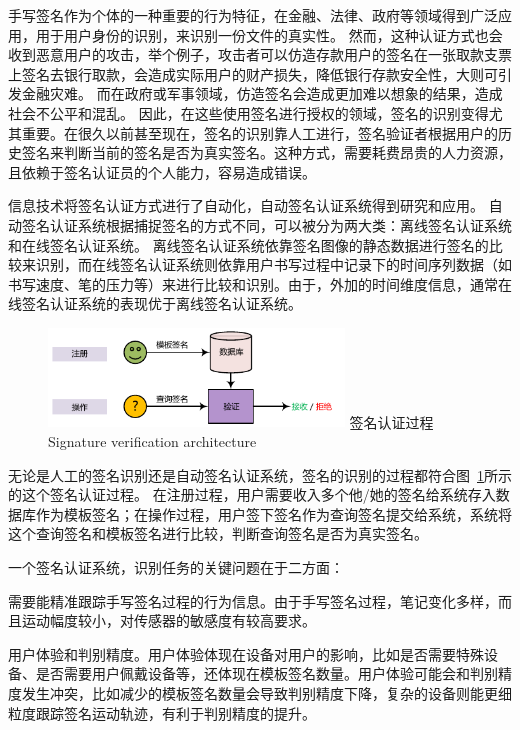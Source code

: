手写签名作为个体的一种重要的行为特征，在金融、法律、政府等领域得到广泛应用，用于用户身份的识别，来识别一份文件的真实性。 然而，这种认证方式也会收到恶意用户的攻击，举个例子，攻击者可以仿造存款用户的签名在一张取款支票上签名去银行取款，会造成实际用户的财产损失，降低银行存款安全性，大则可引发金融灾难。 而在政府或军事领域，仿造签名会造成更加难以想象的结果，造成社会不公平和混乱。 因此，在这些使用签名进行授权的领域，签名的识别变得尤其重要。在很久以前甚至现在，签名的识别靠人工进行，签名验证者根据用户的历史签名来判断当前的签名是否为真实签名。这种方式，需要耗费昂贵的人力资源，且依赖于签名认证员的个人能力，容易造成错误。

信息技术将签名认证方式进行了自动化，自动签名认证系统得到研究和应用。 自动签名认证系统根据捕捉签名的方式不同，可以被分为两大类：离线签名认证系统和在线签名认证系统。 离线签名认证系统依靠签名图像的静态数据进行签名的比较来识别，而在线签名认证系统则依靠用户书写过程中记录下的时间序列数据（如书写速度、笔的压力等）来进行比较和识别。由于，外加的时间维度信息，通常在线签名认证系统的表现优于离线签名认证系统。

\begin{figure}[!htp]
  \centering
  \includegraphics[width=0.7\textwidth]{figure/verification-work-flow.pdf}
  \bicaption
    {签名认证过程}
    {Signature verification architecture}
  \label{fig:signature-verification-architecture}
\end{figure}

无论是人工的签名识别还是自动签名认证系统，签名的识别的过程都符合图~\ref{fig:signature-verification-architecture}所示的这个签名认证过程。 在注册过程，用户需要收入多个他/她的签名给系统存入数据库作为模板签名；在操作过程，用户签下签名作为查询签名提交给系统，系统将这个查询签名和模板签名进行比较，判断查询签名是否为真实签名。

一个签名认证系统，识别任务的关键问题在于二方面：
\begin{enumerate*}[label=\itshape\alph*)\upshape]
    \item 需要能精准跟踪手写签名过程的行为信息。由于手写签名过程，笔记变化多样，而且运动幅度较小，对传感器的敏感度有较高要求。
    \item 用户体验和判别精度。用户体验体现在设备对用户的影响，比如是否需要特殊设备、是否需要用户佩戴设备等，还体现在模板签名数量。用户体验可能会和判别精度发生冲突，比如减少的模板签名数量会导致判别精度下降，复杂的设备则能更细粒度跟踪签名运动轨迹，有利于判别精度的提升。
\end{enumerate*}

